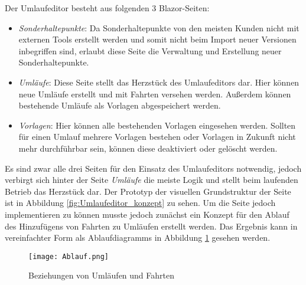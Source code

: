     Der Umlaufeditor besteht aus folgenden 3 Blazor-Seiten: 
    \begin{itemize}
        \item \emph{Sonderhaltepunkte}: Da Sonderhaltepunkte von den meisten Kunden nicht mit externen Tools erstellt werden und somit nicht beim Import neuer Versionen inbegriffen sind, 
                erlaubt diese Seite die Verwaltung und Erstellung neuer Sonderhaltepunkte.
        \item \emph{Umläufe}: Diese Seite stellt das Herzstück des Umlaufeditors dar. Hier können neue Umläufe erstellt und mit Fahrten versehen werden. Außerdem können bestehende Umläufe 
                als Vorlagen abgespeichert werden. 
        \item \emph{Vorlagen}: Hier können alle bestehenden Vorlagen eingesehen werden. Sollten für einen Umlauf mehrere Vorlagen bestehen oder Vorlagen in Zukunft nicht mehr durchführbar sein, können diese
                deaktiviert oder gelöscht werden.
    \end{itemize}

    Es sind zwar alle drei Seiten für den Einsatz des Umlaufeditors notwendig, jedoch verbirgt sich hinter der Seite \emph{Umläufe} die meiste Logik und stellt beim laufenden Betrieb das Herzstück dar.
    Der Prototyp der visuellen Grundstruktur der Seite ist in Abbildung \ref{fig:Umlaufeditor_konzept} zu sehen. Um die Seite jedoch implementieren zu können musste jedoch zunächst ein Konzept für den Ablauf 
    des Hinzufügens von Fahrten zu Umläufen erstellt werden. Das Ergebnis kann in vereinfachter Form als Ablaufdiagramms in Abbildung \ref{fig:Ablauf} gesehen werden.


    \begin{figure}[H]
        \centering
        \texttt{[image: Ablauf.png]}
        \caption{Beziehungen von Umläufen und Fahrten}
        \label{fig:Ablauf}
    \end{figure}


